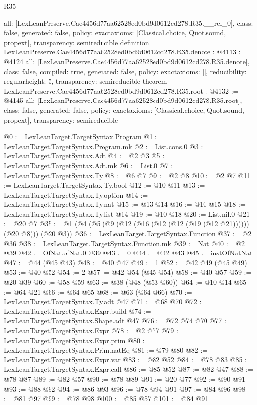 \begin{lexlean}{R35}
\begin{coremodule}
{  all: [LexLeanPreserve.Cae4456d77aa62528ed0bd9d0612cd278.R35.__rel_0],
  class: false,
  generated: false,
  policy: exact{axioms: [Classical.choice, Quot.sound, propext]},
  transparency: semireducible
}
definition LexLeanPreserve.Cae4456d77aa62528ed0bd9d0612cd278.R35.denote : @4113 := @4124 {
  all: [LexLeanPreserve.Cae4456d77aa62528ed0bd9d0612cd278.R35.denote],
  class: false,
  compiled: true,
  generated: false,
  policy: exact{axioms: []},
  reducibility: regular{height: 5},
  transparency: semireducible
}
theorem LexLeanPreserve.Cae4456d77aa62528ed0bd9d0612cd278.R35.root : @4132 := @4145 {
  all: [LexLeanPreserve.Cae4456d77aa62528ed0bd9d0612cd278.R35.root],
  class: false,
  generated: false,
  policy: exact{axioms: [Classical.choice, Quot.sound, propext]},
  transparency: semireducible
}

@0 := LexLeanTarget.TargetSyntax.Program
@1 := LexLeanTarget.TargetSyntax.Program.mk
@2 := List.cons.{0}
@3 := LexLeanTarget.TargetSyntax.Adt
@4 := @2 @3
@5 := LexLeanTarget.TargetSyntax.Adt.mk
@6 := List.{0}
@7 := LexLeanTarget.TargetSyntax.Ty
@8 := @6 @7
@9 := @2 @8
@10 := @2 @7
@11 := LexLeanTarget.TargetSyntax.Ty.bool
@12 := @10 @11
@13 := LexLeanTarget.TargetSyntax.Ty.option
@14 := LexLeanTarget.TargetSyntax.Ty.nat
@15 := @13 @14
@16 := @10 @15
@18 := LexLeanTarget.TargetSyntax.Ty.list @14
@19 := @10 @18
@20 := List.nil.{0}
@21 := @20 @7
@35 := @1 (@4 (@5 (@9 (@12 (@16 (@12 (@12 (@19 (@12 @21)))))) (@20 @8))) (@20 @3))
@36 := LexLeanTarget.TargetSyntax.Function
@37 := @2 @36
@38 := LexLeanTarget.TargetSyntax.Function.mk
@39 := Nat
@40 := @2 @39
@42 := OfNat.ofNat.{0} @39
@43 := 0
@44 := @42 @43
@45 := instOfNatNat
@47 := @44 (@45 @43)
@48 := @40 @47
@49 := 1
@52 := @42 @49 (@45 @49)
@53 := @40 @52
@54 := 2
@57 := @42 @54 (@45 @54)
@58 := @40 @57
@59 := @20 @39
@60 := @58 @59
@63 := @38 (@48 (@53 @60))
@64 := @10 @14
@65 := @64 @21
@66 := @64 @65
@68 := @63 (@64 @66)
@70 := LexLeanTarget.TargetSyntax.Ty.adt @47
@71 := @68 @70
@72 := LexLeanTarget.TargetSyntax.Expr.build
@74 := LexLeanTarget.TargetSyntax.Shape.adt @47
@76 := @72 @74 @70
@77 := LexLeanTarget.TargetSyntax.Expr
@78 := @2 @77
@79 := LexLeanTarget.TargetSyntax.Expr.prim
@80 := LexLeanTarget.TargetSyntax.Prim.natEq
@81 := @79 @80
@82 := LexLeanTarget.TargetSyntax.Expr.var
@83 := @82 @52
@84 := @78 @83
@85 := LexLeanTarget.TargetSyntax.Expr.call
@86 := @85 @52
@87 := @82 @47
@88 := @78 @87
@89 := @82 @57
@90 := @78 @89
@91 := @20 @77
@92 := @90 @91
@93 := @88 @92
@94 := @86 @93
@96 := @78 @94 @91
@97 := @84 @96
@98 := @81 @97
@99 := @78 @98
@100 := @85 @57
@101 := @84 @91

\end{coremodule}
\end{lexlean}

